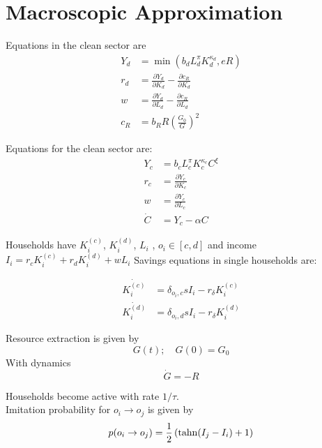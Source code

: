 \section{Macroscopic Approximation}

Equations in the clean sector are
\begin{align}
	Y_d &= \min(b_d L_d^{\pi}K_d^{\kappa_d}, eR) \nonumber \\
	r_d &= \frac{\partial Y_d}{\partial K_d} - \frac{\partial c_R}{\partial K_d} \nonumber \\
	w &=  \frac{\partial Y_d}{\partial L_d} - \frac{\partial c_R}{\partial L_d} \nonumber \\
	c_R &= b_R R \left( \frac{G_0}{G} \right)^2 \nonumber
\end{align}

Equations for the clean sector are:
\begin{align}
	Y_c &= b_c L_c^{\pi}K_c^{\kappa_c} C^{\xi} \nonumber \\
	r_c &= \frac{\partial Y_c}{\partial K_c} \nonumber \\
	w &=  \frac{\partial Y_c}{\partial L_c} \nonumber \\
	\dot{C} &= Y_c - \alpha C \nonumber 
\end{align}

Households have $K_i^{(c)}$, $K_i^{(d)}$,  $L_i$ , $o_i \in [c, d]$ and income $I_i = r_c K_{i}^{(c)} + r_d K_i^{(d)} + w L_i$
Savings equations in single households are:

\begin{align}
	\dot{K_i^{(c)}} &= \delta_{o_i, c} s I_i - r_{\delta} K_i^{(c)} \nonumber \\
	\dot{K_i^{(d)}} &= \delta_{o_i, d} s I_i - r_{\delta} K_i^{(d)} \nonumber
\end{align}

Resource extraction is given by
\begin{equation}
	G(t); \quad G(0) = G_0 \nonumber
\end{equation}
With dynamics
\begin{equation}
	\dot{G} = -R \nonumber
\end{equation}

Households become active with rate $1/\tau$. \\
Imitation probability for $o_i \rightarrow o_j$ is given by 
\begin{equation}
	p(o_i \rightarrow o_j) = \frac{1}{2}\left( {\rm tahn}(I_j - I_i) + 1 \right) \nonumber
\end{equation}

